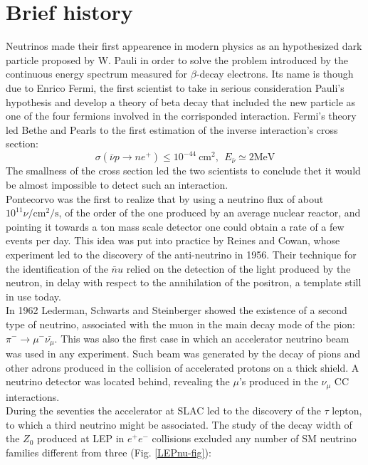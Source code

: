 \documentclass[12pt,a4paper,openright,twoside]{report}
\begin{document}
\section{Brief history}
Neutrinos made their first appearence in modern physics as an hypothesized dark particle proposed by W. Pauli in order to solve the problem introduced by the continuous energy spectrum measured for $\beta$-decay electrons. Its name is though due to Enrico Fermi, the first scientist to take in serious consideration Pauli's hypothesis and develop a theory of beta decay that included the new particle as one of the four fermions involved in the corrisponded interaction. Fermi's theory led Bethe and Pearls to the first estimation of the inverse interaction's cross section:
\begin{equation}
\sigma(\bar{\nu}p\rightarrow ne^+)\leq 10^{-44} \ \text{cm}^2, \ \ E_{\bar{\nu}}\simeq 2 \text{MeV} 
\end{equation}
The smallness of the cross section led the two scientists to conclude thet it would be almost impossible to detect such an interaction. \\
Pontecorvo was the first to realize that by using a neutrino flux of about $10^{11}\nu/\text{cm}^2/\text{s}$, of the order of the one produced by an average nuclear reactor, and pointing it towards a ton mass scale detector one could obtain a rate of a few events per day. This idea was put into practice by Reines and Cowan, whose experiment led to the discovery of the anti-neutrino in 1956. Their technique for the identification of the $\bar nu$ relied on the detection of the light produced by the neutron, in delay with respect to the annihilation of the positron, a template still in use today. \\
In 1962 Lederman, Schwarts and Steinberger showed the existence of a second type of neutrino, associated with the muon in the main decay mode of the pion: $\pi ^- \rightarrow \mu^-\bar{\nu_\mu} $. This was also the first case in which an accelerator neutrino beam was used in any experiment. Such beam was generated by the decay of pions and other adrons produced in the collision of accelerated protons on a thick shield. A neutrino detector was located behind, revealing the $\mu$'s produced in the $\nu_\mu$ CC interactions.\\
During the seventies the accelerator at SLAC led to the discovery of the $\tau$ lepton, to which a third neutrino might be associated. The study of the decay width of the $Z_0$ produced at LEP in $e^+e^-$ collisions excluded any number of SM neutrino families different from three (Fig. \ref{LEPnu-fig}):
\end{document}
